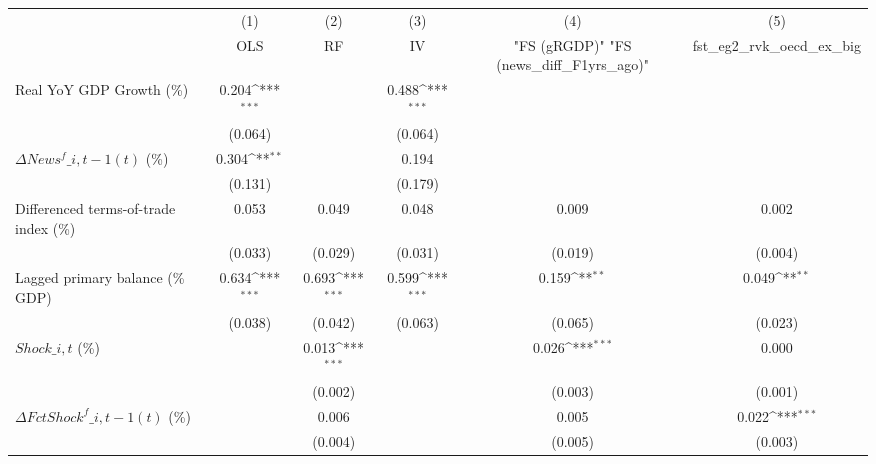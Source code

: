{
\def\sym#1{\ifmmode^{#1}\else\(^{#1}\)\fi}
\begin{tabular}{l*{5}{c}}
\toprule
                    &\multicolumn{1}{c}{(1)}&\multicolumn{1}{c}{(2)}&\multicolumn{1}{c}{(3)}&\multicolumn{1}{c}{(4)}&\multicolumn{1}{c}{(5)}\\
                    &\multicolumn{1}{c}{OLS}&\multicolumn{1}{c}{RF}&\multicolumn{1}{c}{IV}&\multicolumn{1}{c}{ "FS (gRGDP)"  "FS (news\_diff\_F1yrs\_ago)" }&\multicolumn{1}{c}{fst\_eg2\_rvk\_oecd\_ex\_big}\\
\midrule
Real YoY GDP Growth (\%)&       0.204\sym{***}&                     &       0.488\sym{***}&                     &                     \\
                    &     (0.064)         &                     &     (0.064)         &                     &                     \\
\addlinespace
$ \Delta News^f\_{i,t-1}(t)$ (\%)&       0.304\sym{**} &                     &       0.194         &                     &                     \\
                    &     (0.131)         &                     &     (0.179)         &                     &                     \\
\addlinespace
Differenced terms-of-trade index (\%)&       0.053         &       0.049         &       0.048         &       0.009         &       0.002         \\
                    &     (0.033)         &     (0.029)         &     (0.031)         &     (0.019)         &     (0.004)         \\
\addlinespace
Lagged primary balance (\% GDP)&       0.634\sym{***}&       0.693\sym{***}&       0.599\sym{***}&       0.159\sym{**} &       0.049\sym{**} \\
                    &     (0.038)         &     (0.042)         &     (0.063)         &     (0.065)         &     (0.023)         \\
\addlinespace
$ Shock\_{i,t}$ (\%) &                     &       0.013\sym{***}&                     &       0.026\sym{***}&       0.000         \\
                    &                     &     (0.002)         &                     &     (0.003)         &     (0.001)         \\
\addlinespace
$ \Delta FctShock^f\_{i,t-1}(t)$ (\%)&                     &       0.006         &                     &       0.005         &       0.022\sym{***}\\
                    &                     &     (0.004)         &                     &     (0.005)         &     (0.003)         \\

\end{tabular}}
